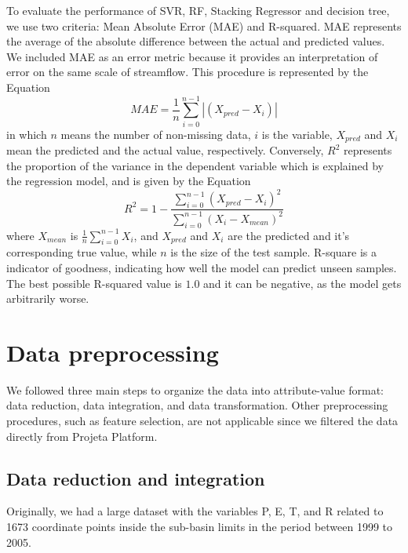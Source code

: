 \documentclass[12pt]{article}
\begin{document}
To evaluate the performance of SVR, RF, Stacking Regressor and decision tree, we use two criteria: Mean Absolute Error (MAE) and R-squared. MAE represents the average of the absolute difference between the actual and predicted values. We included MAE as an error metric because it provides an interpretation of error on the same scale of streamflow. This procedure is represented by the Equation
    \begin{equation}
        \label{eqn:mae}
        MAE={\frac{1}{n}\sum_{i=0}^{n-1}|(X_{pred}-X_{i})|}
    \end{equation}
in which $n$ means the number of non-missing data, $i$ is the variable, $X_{pred}$ and $X_{i}$ mean the predicted and the actual value, respectively. Conversely, $R^2$ represents the proportion of the variance in the dependent variable which is explained by the regression model, and is given by the Equation
    \begin{equation}
        \label{eqn:r2}
        R^2={1 - \frac{\sum\limits_{i=0}^{n-1}(X_{pred}-X_{i})^{2}}
                      {\sum\limits_{i=0}^{n-1}(X_{i}-X_{mean})^{2}}}
    \end{equation}
where $X_{mean}$ is $\frac{1}{n}\sum_{i=0}^{n-1}X_{i}$, and $X_{pred}$ and $X_{i}$ are the predicted and it's corresponding true value, while $n$ is the size of the test sample. R-square is a indicator of goodness, indicating how well the model can predict unseen samples. The best possible R-squared value is $1.0$ and it can be negative, as the model gets arbitrarily worse.

\section{Data preprocessing}
\label{sec:DataPreprocessing}

We followed three main steps to organize the data into attribute-value format: data reduction, data integration, and data transformation. Other preprocessing procedures, such as feature selection, are not applicable since we filtered the data directly from Projeta Platform.

\subsection{Data reduction and integration}
\label{ssec:DataReductionIntegration}

Originally, we had a large dataset with the variables P, E, T, and R related to 1673 coordinate points inside the sub-basin limits in the period between 1999 to 2005.
\end{document}
